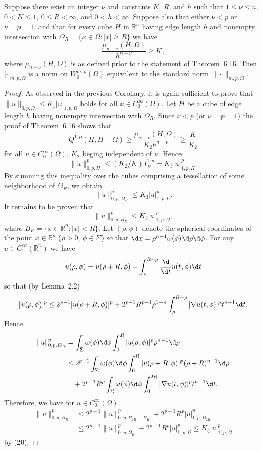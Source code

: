 \begin{theorem}
  Suppose there exist an integer $\nu$ and constants $K$, $R$, and $h$ such that
  $1\leq\nu\leq n$, $0<K\leq 1$, $0\leq R<\infty$, and $0<h<\infty$.
  Suppose also that either $\nu<p$ or $\nu=p=1$, and that for every cube $H$
  in $\mathbb{R}^n$ having edge length $h$ and nonempty intersection with
  $\Omega_R = \{x\in\Omega : |x|\geq R\}$ we have
  \[ \frac{\mu_{n-\nu}(H,\Omega)}{h^{n-\nu}} \geq K, \]
  where $\mu_{n-\nu}(H,\Omega)$ is as defined prior to the statement of Theorem~6.16.
  Then $|\cdot|_{m,p,\Omega}$ is a norm on $W_0^{m,p}(\Omega)$
  equivalent to the standard norm $\|\cdot\|_{m,p,\Omega}$.
\end{theorem}

\begin{proof}
  As observed in the previous Corollary, it is again sufficient to prove that
  $\|u\|_{0,p,\Omega} \leq K_1 |u|_{1,p,\Omega}$ holds for all $u\in C_0^\infty(\Omega)$.
  Let $H$ be a cube of edge length $h$ having nonempty intersection with $\Omega_R$.
  Since $\nu<p$ (or $\nu=p=1$) the proof of Theorem~6.16 shows that
  \[ Q^{1,p}(H,H-\Omega) \geq \frac{\mu_{n-\nu}(H,\Omega)}{K_2 h^{n-\nu}}
      \geq \frac{K}{K_2} \]
  for all $u\in C_0^\infty(\Omega)$, $K_2$ beging independent of $u$. Hence
  \[ \|u\|_{0,p,H}^p \leq (K_2/K) I_H^{1,p} = K_3 |u|_{1,p,H}^p. \]
  By summing this inequality over the cubes comprising a tessellation of some
  neighborhood of $\Omega_R$, we obtain
  \begin{equation}\label{eq:6.20}
    \|u\|_{0,p,\Omega_R}^p \leq K_3 |u|_{1,p,\Omega}^p.
  \end{equation}
  It remains to be proven that
  \[ \|u\|_{0,p,B_R}^p \leq K_3 |u|_{1,p,\Omega}^p, \]
  where $B_R = \{x\in\mathbb{R}^n : |x|<R\}$. Let $(\rho,\phi)$ denote the spherical
  coordinates of the point $x\in\mathbb{R}^n$ ($\rho>0$, $\phi\in\Sigma$)
  so that $\d x = \rho^{n-1} \omega(\phi) \d\rho\d\phi$.
  For any $u\in C^\infty(\mathbb{R}^n)$ we have
  \[ u(\rho,\phi) = u(\rho+R,\phi) - \int_\rho^{R+\rho} \frac{\d}{\d t} u(t,\phi) \d t \]
  so that (by Lemma~2.2)
  \[ |u(\rho,\phi)|^p \leq 2^{p-1} |u(\rho+R,\phi)|^p + 2^{p-1}R^{p-1}\rho^{1-n}
      \int_\rho^{R+\rho} |\nabla u(t,\phi)|^p t^{n-1} \d t. \]
  Hence
  \begin{align*}
    \|u\|_{0,p,B_R}^p
    & = \int_{\Sigma} \omega(\phi) \d\phi \int_0^R |u(\rho,\phi)|^p \rho^{n-1} \d\rho \\
    & \leq 2^{p-1} \int_{\Sigma} \omega(\phi) \d\phi \int_0^R |u(\rho+R,\phi)|^p
        (\rho+R)^{n-1} \d\rho \\
    & \quad + 2^{p-1} R^p \int_{\Sigma} \omega(\phi) \d\phi \int_0^{2R}
        |\nabla u(t,\phi)|^p t^{n-1} \d t.
  \end{align*}
  Therefore, we have for $u\in C_0^\infty(\Omega)$
  \begin{align*}
    \|u\|_{0,p,B_R}^p
    & \leq 2^{p-1} \|u\|_{0,p,B_{2R}-B_R}^p + 2^{p-1} R^p |u|_{1,p,B_{2R}}^p \\
    & \leq 2^{p-1} \|u\|_{0,p,\Omega_R}^p + 2^{p-1} R^p |u|_{1,p,\Omega}^p \leq K_4 |u|_{1,p,\Omega}^p
  \end{align*}
  by (20).
\end{proof}


